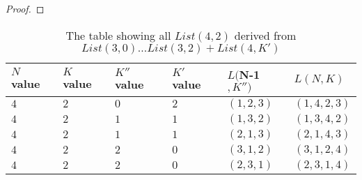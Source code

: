 \begin{proof}
\end{proof}

\begin{table}
  \begin{tabular}{|p{2cm}||p{2cm}||p{2cm}||p{2cm} ||p{2cm} ||p{2cm}||}
     \hline
        \small{$N$ value}& \small{$K$ value} & \small{$K''$ value} & \small{$K'$ value} &\small{$L($N-1$, K'')$} & \small{$L(N, K)$}\\
        \hline
        \small{$4$} & \small{$2$} & \small{$0$} & \small{$2$} & \small{$(1,2,3)$} & \small{$(1,4,2,3)$} \\
        \hline
        \small{$4$} & \small{$2$} & \small{$1$} & \small{$1$} & \small{$(1,3,2)$} & \small{$(1,3,4,2)$} \\
        \small{$4$} & \small{$2$} & \small{$1$} & \small{$1$} & \small{$(2,1,3)$} & \small{$(2,1,4,3)$} \\
        \hline
        \small{$4$} & \small{$2$} & \small{$2$} & \small{$0$} & \small{$(3,1,2)$} & \small{$(3,1,2,4)$} \\                
        \small{$4$} & \small{$2$} & \small{$2$} & \small{$0$} & \small{$(2,3,1)$} & \small{$(2,3,1,4)$} \\
        \hline
  \end{tabular}
  \caption{The table showing all $List(4, 2)$ derived from $List(3, 0) \dots List(3, 2) + List(4, K')$}
  \label{Table:List4,2}
\end{table}




